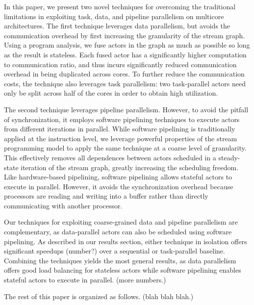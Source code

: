 In this paper, we present two novel techniques for overcoming the
traditional limitations in exploiting task, data, and pipeline
parallelism on multicore architectures.  The first technique leverages
data parallelism, but avoids the communication overhead by first
increasing the granularity of the stream graph.  Using a program
analysis, we fuse actors in the graph as much as possible so long as
the result is stateless.  Each fused actor has a significantly higher
computation to communication ratio, and thus incurs significantly
reduced communication overhead in being duplicated across cores.  To
further reduce the communication costs, the technique also leverages
task parallelism: two task-parallel actors need only be split across
half of the cores in order to obtain high utilization.

The second technique leverages pipeline parallelism.  However, to
avoid the pitfall of synchronization, it employs software pipelining
techniques to execute actors from different iterations in parallel.
While software pipelining is traditionally applied at the instruction
level, we leverage powerful properties of the stream programming model
to apply the same technique at a coarse level of granularity.  This
effectively removes all dependences between actors scheduled in a
steady-state iteration of the stream graph, greatly increasing the
scheduling freedom.  Like hardware-based pipelining, software
pipelining allows stateful actors to execute in parallel.
However, it avoids the synchronization overhead because processors are
reading and writing into a buffer rather than directly communicating
with another processor.

Our techniques for exploiting coarse-grained data and pipeline
parallelism are complementary, as data-parallel actors can also be
scheduled using software pipelining.  As described in our results
section, either technique in isolation offers significant speedups
(number?) over a sequential or task-parallel baseline.  Combining the
techniques yields the most general results, as data parallelism offers
good load balancing for stateless actors while software pipelining
enables stateful actors to execute in parallel.  (more numbers.)

The rest of this paper is organized as follows.  (blah blah blah.)

